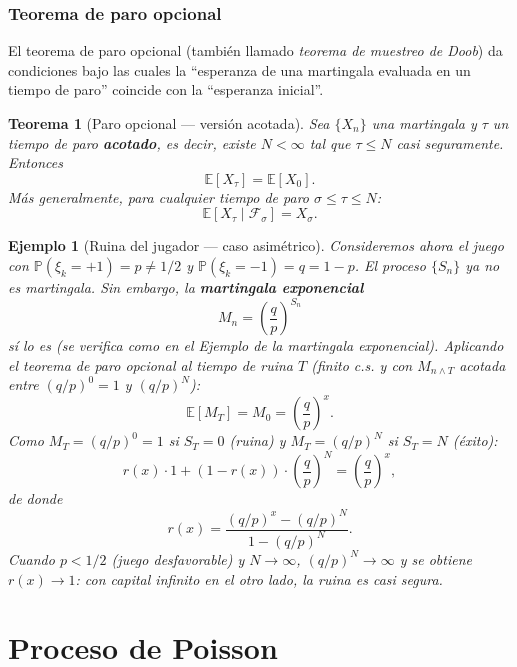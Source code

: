 \documentclass[12pt]{book}
\newtheorem{theorem}{Teorema}[chapter]
\newtheorem{example}{Ejemplo}[chapter]
\begin{document}
\subsection{Teorema de paro opcional}

El teorema de paro opcional (también llamado \emph{teorema de muestreo de Doob}) da condiciones bajo las cuales la ``esperanza de una martingala evaluada en un tiempo de paro'' coincide con la ``esperanza inicial''.

\begin{theorem}[Paro opcional — versión acotada]
\label{thm:paro_opcional_acotado}
    Sea $\{X_n\}$ una martingala y $\tau$ un tiempo de paro \textbf{acotado}, es decir, existe $N < \infty$ tal que $\tau \le N$ casi seguramente. Entonces
    \[
        \mathbb{E}[X_\tau] = \mathbb{E}[X_0].
    \]
    Más generalmente, para cualquier tiempo de paro $\sigma \le \tau \le N$:
    \[
        \mathbb{E}[X_\tau \mid \mathcal{F}_\sigma] = X_\sigma.
    \]
\end{theorem}

\begin{example}[Ruina del jugador — caso asimétrico]
\label{ej:ruina_asimetrico}
    Consideremos ahora el juego con $\mathbb{P}(\xi_k = +1) = p \ne 1/2$ y $\mathbb{P}(\xi_k = -1) = q = 1-p$. El proceso $\{S_n\}$ ya no es martingala. Sin embargo, la \textbf{martingala exponencial}
    \[
        M_n = \left(\frac{q}{p}\right)^{S_n}
    \]
    sí lo es (se verifica como en el Ejemplo de la martingala exponencial). Aplicando el teorema de paro opcional al tiempo de ruina $T$ (finito c.s. y con $M_{n \wedge T}$ acotada entre $(q/p)^0 = 1$ y $(q/p)^N$):
    \[
        \mathbb{E}[M_T] = M_0 = \left(\frac{q}{p}\right)^x.
    \]
    Como $M_T = (q/p)^0 = 1$ si $S_T = 0$ (ruina) y $M_T = (q/p)^N$ si $S_T = N$ (éxito):
    \[
        r(x) \cdot 1 + (1 - r(x)) \cdot \left(\frac{q}{p}\right)^N = \left(\frac{q}{p}\right)^x,
    \]
    de donde
    \[
        \boxed{r(x) = \frac{(q/p)^x - (q/p)^N}{1 - (q/p)^N}}.
    \]
    Cuando $p < 1/2$ (juego desfavorable) y $N \to \infty$, $(q/p)^N \to \infty$ y se obtiene $r(x) \to 1$: con capital infinito en el otro lado, la ruina es casi segura.
\end{example}







\chapter{Proceso de Poisson}
\end{document}

